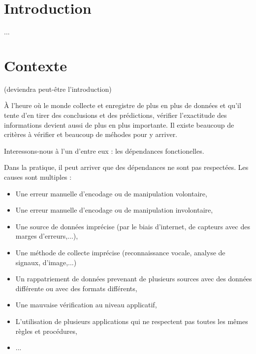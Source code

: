 \documentclass[12pt, a4paper, oneside, titlepage]{book}%
\begin{document}
\newpage
\pagestyle{fancy}  %
\mainmatter  %
\chapter{Introduction}\label{CHintro}
...
\vspace*{20mm}


\cleardoublepage %
\chapter{Contexte}\label{CHcontexte}
(deviendra peut-être l'introduction)

\`{A} l'heure où le monde collecte et enregistre de plus en plus de données et qu'il tente d'en tirer des conclusions et des prédictions, vérifier l'exactitude des informations devient aussi de plus en plus importante. Il existe beaucoup de critères à vérifier et beaucoup de méhodes pour y arriver.

Interessons-nous à l'un d'entre eux : les dépendances fonctionelles.

Dans la pratique, il peut arriver que des dépendances ne sont pas respectées. Les causes sont multiples :
\begin{itemize}
\item Une erreur manuelle d'encodage ou de manipulation volontaire, 
\item Une erreur manuelle d'encodage ou de manipulation involontaire, 
\item Une source de données imprécise (par le biais d'internet, de capteurs avec des marges d'erreurs,...), 
\item Une méthode de collecte imprécise (reconnaissance vocale, analyse de signaux, d'image,...)
\item Un rappatriement de données prevenant de plusieurs sources avec des données différente ou avec des formats différents,
\item Une mauvaise vérification au niveau applicatif,
\item L'utilisation de plusieurs applications qui ne respectent pas toutes les mêmes règles et procédures,
\item ...
\end{itemize}
\end{document}
